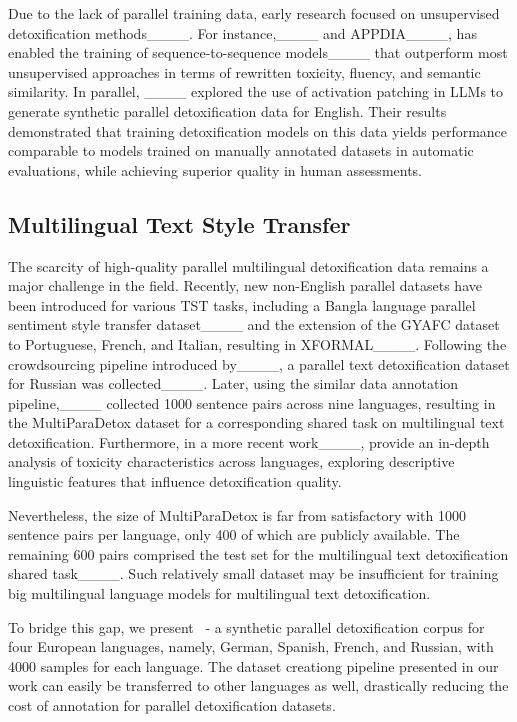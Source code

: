 Due to the lack of parallel training data, early research focused on unsupervised detoxification methods____. For instance,____ and APPDIA____, has enabled the training of sequence-to-sequence models____ that outperform most unsupervised approaches in terms of rewritten toxicity, fluency, and semantic similarity. In parallel, ____ explored the use of activation patching in LLMs to generate synthetic parallel detoxification data for English. Their results demonstrated that training detoxification models on this data yields performance comparable to models trained on manually annotated datasets in automatic evaluations, while achieving superior quality in human assessments.

\subsection{Multilingual Text Style Transfer}

The scarcity of high-quality parallel multilingual detoxification data remains a major challenge in the field. Recently, new non-English parallel datasets have been introduced for various TST tasks, including a Bangla language parallel sentiment style transfer dataset____ and the extension of the GYAFC dataset to Portuguese, French, and Italian, resulting in XFORMAL____. Following the crowdsourcing pipeline introduced by____, a parallel text detoxification dataset for Russian was collected____. Later, using the similar data annotation pipeline,____ collected 1000 sentence pairs across nine languages, resulting in the MultiParaDetox dataset for a corresponding shared task on multilingual text detoxification. Furthermore, in a more recent work____, provide an in-depth analysis of toxicity characteristics across languages, exploring descriptive linguistic features that influence detoxification quality.

Nevertheless, the size of MultiParaDetox is far from satisfactory with 1000 sentence pairs per language, only 400 of which are publicly available. The remaining 600 pairs comprised the test set for the multilingual text detoxification shared task____. Such relatively small dataset may be insufficient for training big multilingual language models for multilingual text detoxification.

To bridge this gap, we present \dataset~- a synthetic parallel detoxification corpus for four European languages, namely, German, Spanish, French, and Russian, with 4000 samples for each language. The dataset creationg pipeline presented in our work can easily be transferred to other languages as well, drastically reducing the cost of annotation for parallel detoxification datasets.